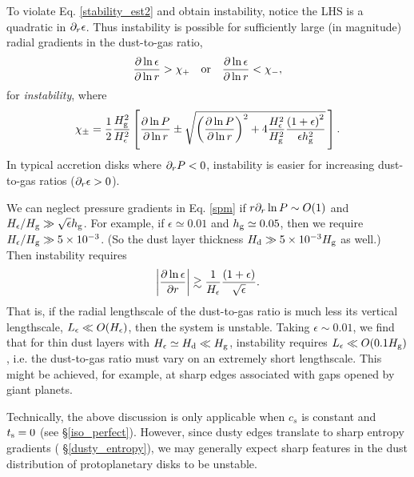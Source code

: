 
To violate Eq. \ref{stability_est2} and obtain instability, notice the 
LHS is a quadratic in $\partial_r\epsilon$. Thus instability is possible for
sufficiently large (in magnitude) radial gradients  in the dust-to-gas
ratio,  
\begin{align}
  \frac{\partial\ln{\epsilon}}{\partial\ln{r}} > \chi_+ \quad \mathrm{or} \quad 
  \frac{\partial\ln{\epsilon}}{\partial\ln{r}} < \chi_-,
\end{align}
for \emph{instability}, where
\begin{align}\label{spm}
\chi_\pm = \frac{1}{2}\frac{H_\mathrm{g}^2}{H_\epsilon^2} 
  \left[
  \frac{\partial\ln{P}}{\partial\ln{r}} \pm 
  \sqrt{
  \left(\frac{\partial\ln{P}}{\partial\ln{r}}\right)^2 + 
  4 \frac{H_\epsilon^2}{H_\mathrm{g}^2}
  \frac{\left(1+\epsilon\right)^2}{\epsilon h_\mathrm{g}^2}
  }
  \,\right]. 
\end{align} 
In typical accretion disks where $\partial_rP<0$, instability is easier
for increasing dust-to-gas ratios ($\partial_r\epsilon > 0$).  

We can neglect pressure gradients in Eq. \ref{spm} 
if $r\partial_r\ln{P}\sim O(1)$ and $H_\epsilon/H_\mathrm{g}\gg
\sqrt{\epsilon}h_\mathrm{g}$. For example, if $\epsilon\simeq 0.01$ and
$h_\mathrm{g}\simeq 0.05$, then we require $H_\epsilon/H_\mathrm{g}\gg
5\times10^{-3}$. (So the dust layer thickness $H_\mathrm{d}\gg 5
\times10^{-3}H_\mathrm{g}$ as well.) Then 
instability requires 
\begin{align}\label{dust_edge}
\left|\frac{\partial\ln{\epsilon}}{\partial r}\right| \gtrsim
  \frac{1}{H_\epsilon}\frac{\left(1+\epsilon\right)}{\sqrt{\epsilon}}.
\end{align}
That is, if the radial lengthscale of the dust-to-gas ratio 
is much less its vertical lengthscale, $L_\epsilon\ll O(H_\epsilon)$, 
then the system is  unstable.  
Taking $\epsilon\sim 0.01$,  we find that 
for thin dust layers with $H_\epsilon \simeq H_\mathrm{d}\ll H_\mathrm{g}$,  instability
requires $L_\epsilon\ll O(0.1H_\mathrm{g})$, i.e. the dust-to-gas ratio must 
vary on an extremely short lengthscale. This might be achieved, for
example, at sharp edges associated with gaps opened by giant planets. 

Technically, the above discussion is only applicable when $c_s$ is
constant and $t_\mathrm{s}=0$ (see \S\ref{iso_perfect}). However, since
dusty edges translate to sharp entropy gradients (
\S\ref{dusty_entropy}), we may generally expect sharp features in the
dust distribution of protoplanetary disks to be unstable.    


